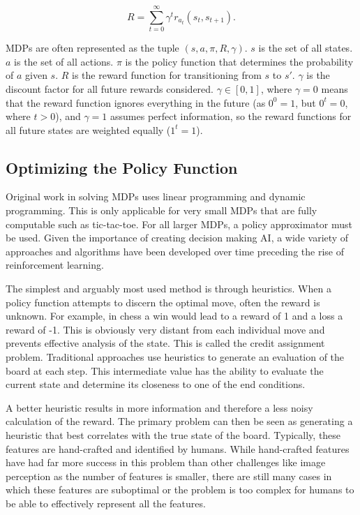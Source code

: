 \documentclass{article}
\begin{document}
$$ R = \sum_{t=0}^{\infty} \gamma^t r_{a_t}(s_t,s_{t+1}).$$

MDPs are often represented as the tuple $(s, a, \pi, R, \gamma)$. $s$ is the set of all states. $a$ is the set of all actions. $\pi$ is the policy function that determines the probability of $a$ given $s$. $R$ is the reward function for transitioning from $s$ to $s'$. $\gamma$ is the discount factor for all future rewards considered. $\gamma \in [0,1]$, where $\gamma = 0$ means that the reward function ignores everything in the future (as $0^0=1$, but $0^t=0$, where $t>0$), and $\gamma = 1$ assumes perfect information, so the reward functions for all future states are weighted equally ($1^t=1$).

\subsection{Optimizing the Policy Function}

Original work in solving MDPs uses linear programming and dynamic programming. This is only applicable for very small MDPs that are fully computable such as tic-tac-toe. For all larger MDPs, a policy approximator must be used. Given the importance of creating decision making AI, a wide variety of approaches and algorithms have been developed over time preceding the rise of reinforcement learning.

The simplest and arguably most used method is through heuristics. When a policy function attempts to discern the optimal move, often the reward is unknown. For example, in chess a win would lead to a reward of 1 and a loss a reward of -1. This is obviously very distant from each individual move and prevents effective analysis of the state. This is called the credit assignment problem. Traditional approaches use heuristics to generate an evaluation of the board at each step. This intermediate value has the ability to evaluate the current state and determine its closeness to one of the end conditions.

A better heuristic results in more information and therefore a less noisy calculation of the reward. The primary problem can then be seen as generating a heuristic that best correlates with the true state of the board. Typically, these features are hand-crafted and identified by humans. While hand-crafted features have had far more success in this problem than other challenges like image perception as the number of features is smaller, there are still many cases in which these features are suboptimal or the problem is too complex for humans to be able to effectively represent all the features.
	
\end{document}
